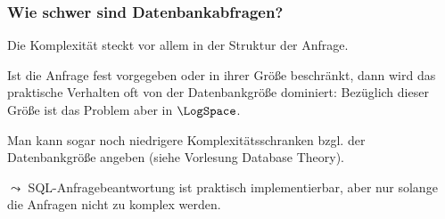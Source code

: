 \documentclass[aspectratio=1610,onlymath]{beamer}
\begin{document}
\begin{frame}\frametitle{Wie schwer sind Datenbankabfragen?}

\bigskip

Die Komplexität steckt vor allem in der Struktur der Anfrage.\bigskip

Ist die Anfrage fest vorgegeben oder in ihrer Größe beschränkt, dann wird das praktische Verhalten oft von der Datenbankgröße dominiert: Bezüglich dieser Größe ist das Problem aber in $\LogSpace$.\bigskip

Man kann sogar noch niedrigere Komplexitätsschranken bzgl. der Datenbankgröße angeben (siehe Vorlesung Database Theory).
\bigskip

\alert{$\leadsto$ SQL-Anfragebeantwortung ist praktisch implementierbar, aber nur solange die Anfragen nicht zu komplex werden.}

\end{frame}

\end{document}

